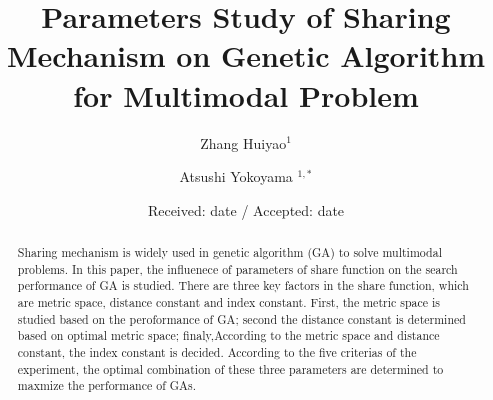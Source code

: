 \documentclass[smallextended]{svjour3}       %
\begin{document}
\title{Parameters Study of Sharing Mechanism on Genetic Algorithm for Multimodal Problem}
\author{Zhang Huiyao$^1$  \and
	Atsushi Yokoyama $^{1,*}$
}
\date{Received: date / Accepted: date}
\maketitle

\begin{abstract}
    Sharing mechanism is widely used in genetic algorithm (GA) to solve multimodal problems.
    In this paper, the influenece of parameters of share function on the search performance of GA is
    studied. There are three key factors in the share function, which are metric space, distance constant
    and index constant. First, the metric space is studied based on the peroformance of GA; second the 
    distance constant is determined based on optimal metric space; finaly,According to the metric space
    and distance constant, the index constant is decided. According to the five criterias of the experiment,
    the optimal combination of these three parameters are determined to maxmize the performance of GAs.
\end{abstract}
\end{document}
